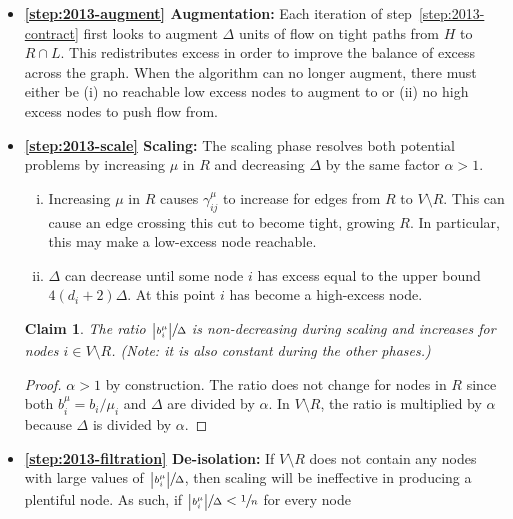 \documentclass[11pt]{article}
\newtheorem{claim}[theorem]{Claim}
\theoremstyle{definition}
\theoremstyle{definition}
\theoremstyle{definition}
\newcommand{\biu}{b_{i}^{\mu}}
\newcommand{\giij}{\gamma_{ij}^{\mu}}
\begin{document}
\begin{itemize}
	\item \textbf{\ref{step:2013-augment} Augmentation:} Each iteration of
		step~\ref{step:2013-contract} first looks to augment $\Delta$ units of flow on
tight paths from $H$ to $R \cap L$. This redistributes excess in order to
improve the balance of excess across the graph. 
When the algorithm can no longer augment,
there must either be (i) no
reachable low excess nodes to augment to or (ii) no high excess nodes to push
flow from.
\item \textbf{\ref{step:2013-scale} Scaling:} The scaling phase resolves both potential problems by increasing $\mu$ in $R$ and
decreasing $\Delta$ by the same factor $\alpha > 1$. 
\begin{enumerate}[(i),itemsep=0mm]
\item Increasing $\mu$ in $R$ causes
$\gamma_{ij}^\mu$ to increase for edges from $R$
to $V \setminus R$. This can cause an edge crossing this cut to become tight, growing $R$.
In particular, this may make a low-excess node reachable.
\item $\Delta$ can decrease until some node $i$ has excess equal to the upper bound $4(d_i + 2)\Delta$.
At this point $i$ has become a high-excess node.
\end{enumerate}
\begin{claim}
	The ratio $\sfrac{\abs{b_i^\mu}}{\Delta}$ is non-decreasing during scaling and
    increases for nodes $i \in V \setminus R$.
	(Note: it is also constant during the other phases.)
\end{claim}
\begin{proof}
$\alpha > 1$ by construction. The ratio does not change for nodes in $R$ since both
$\biu = b_i/\mu_i$ and $\Delta$ are divided by $\alpha$.
In $V \setminus R$, the ratio is multiplied by
$\alpha$ because $\Delta$ is divided by $\alpha$. 
\end{proof}
\item \textbf{\ref{step:2013-filtration} De-isolation:} If $V \setminus R$ does not contain any
nodes with large values of $\sfrac{\abs{b_i^\mu}}{\Delta}$,
then scaling will be ineffective in producing a plentiful node.
As such, if $\sfrac{\abs{b_i^\mu}}{\Delta} < \sfrac{1}{n}$ for every node

\end{itemize}
\end{document}
